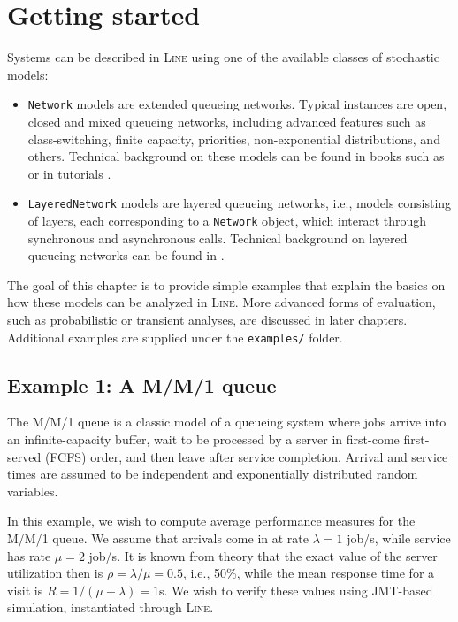 \chapter{Getting started}
\label{getting-started}
Systems can be described in \textsc{Line} using one of the available classes of stochastic models:
\begin{itemize}
\item \texttt{Network} models are extended queueing networks. Typical instances are open, closed and mixed queueing networks, including advanced features such as class-switching, finite capacity,
    priorities, non-exponential distributions, and others. Technical background on
    these models can be found in books such as \cite{BolGMT06,LazZGS84} or in tutorials \cite{Lav89,Bal00}.
\item \texttt{LayeredNetwork} models are layered queueing networks, i.e., models consisting of layers, each corresponding
    to a \texttt{Network} object, which interact through synchronous and asynchronous calls. Technical background on
    layered queueing networks can be found in \cite{lqntut}.
\end{itemize}
The goal of this chapter is to provide simple examples that explain the basics on how these models can be analyzed in \textsc{Line}. More advanced forms of evaluation, such as probabilistic or transient analyses, are discussed in later chapters. Additional examples are supplied under the \texttt{examples/} folder.

\section{Example 1: A M/M/1 queue}
\label{example-1-mm1-queue}
The M/M/1 queue is a classic model of a queueing system where jobs arrive into an infinite-capacity buffer, wait to be processed by a server in first-come first-served (FCFS) order, and then leave after service completion. Arrival and service times are assumed to be independent and exponentially distributed random variables.

In this example, we wish to compute average performance measures for the M/M/1 queue. We assume that arrivals come in at rate $\lambda=1$ job/s, while service has rate $\mu=2$ job/s. It is known from theory that the exact value of the server utilization then is $\rho=\lambda/\mu=0.5$, i.e., 50\%, while the mean response time for a visit is $R=1/(\mu-\lambda)=1$s. We wish to verify these values using JMT-based simulation, instantiated through \textsc{Line}.

